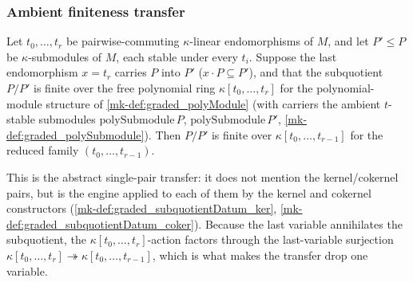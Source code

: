 \subsubsection*{Ambient finiteness transfer}

\begin{lemma}\label{mk-lem:graded_subquotient_finite_transfer}
  \leanok

  Let \(t_0, \dots, t_r\) be pairwise-commuting \(\kappa\)-linear endomorphisms of
  \(M\), and let \(P' \le P\) be \(\kappa\)-submodules of \(M\), each stable under
  every \(t_i\). Suppose the last endomorphism \(x = t_r\) carries \(P\) into \(P'\)
  (\(x \cdot P \subseteq P'\)), and that the subquotient \(P/P'\) is finite over the
  free polynomial ring \(\kappa[t_0, \dots, t_r]\) for the polynomial-module structure
  of \ref{mk-def:graded_polyModule} (with carriers the ambient \(t\)-stable submodules
  \(\mathrm{polySubmodule}\,P\), \(\mathrm{polySubmodule}\,P'\),
  \ref{mk-def:graded_polySubmodule}). Then \(P/P'\) is finite over
  \(\kappa[t_0, \dots, t_{r-1}]\) for the reduced family \((t_0, \dots, t_{r-1})\).

  This is the abstract single-pair transfer: it does not mention the kernel/cokernel
  pairs, but is the engine applied to each of them by the kernel and cokernel
  constructors (\ref{mk-def:graded_subquotientDatum_ker},
  \ref{mk-def:graded_subquotientDatum_coker}). Because the last variable
  annihilates the subquotient, the \(\kappa[t_0, \dots, t_r]\)-action factors through
  the last-variable surjection \(\kappa[t_0, \dots, t_r] \twoheadrightarrow
  \kappa[t_0, \dots, t_{r-1}]\), which is what makes the transfer drop one variable.
\end{lemma}

